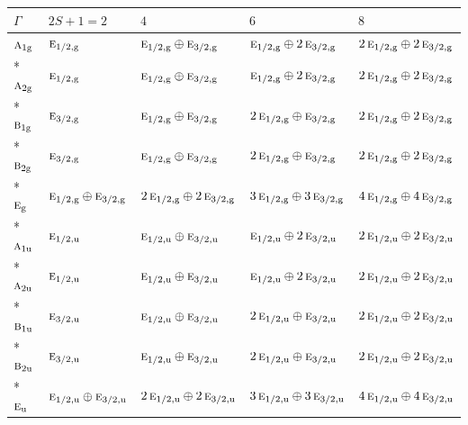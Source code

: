 \documentclass[10pt,a4paper]{article}
\numberwithin{equation}{section}
\newcommand{\irr}[1]{\text{\normalfont\scshape #1}}
\newcommand{\ptag}[1]{\mathrm{#1}}
\begin{document}
{\small\setlength{\tabcolsep}{3pt}\begin{longtable}{@{}lllll@{}}\toprule
$\Gamma$ & $2S + 1 = 2$ & $4$ & $6$ & $8$\\\midrule\endhead
\bottomrule\endfoot\endlastfoot
$\irr{a}_{1\ptag{g}}$ & $\irr{e}_{1/2,\ptag{g}}$ & $\irr{e}_{1/2,\ptag{g}}\oplus \irr{e}_{3/2,\ptag{g}}$ & $\irr{e}_{1/2,\ptag{g}}\oplus 2\,\irr{e}_{3/2,\ptag{g}}$ & $2\,\irr{e}_{1/2,\ptag{g}}\oplus 2\,\irr{e}_{3/2,\ptag{g}}$\\*
$\irr{a}_{2\ptag{g}}$ & $\irr{e}_{1/2,\ptag{g}}$ & $\irr{e}_{1/2,\ptag{g}}\oplus \irr{e}_{3/2,\ptag{g}}$ & $\irr{e}_{1/2,\ptag{g}}\oplus 2\,\irr{e}_{3/2,\ptag{g}}$ & $2\,\irr{e}_{1/2,\ptag{g}}\oplus 2\,\irr{e}_{3/2,\ptag{g}}$\\*
$\irr{b}_{1\ptag{g}}$ & $\irr{e}_{3/2,\ptag{g}}$ & $\irr{e}_{1/2,\ptag{g}}\oplus \irr{e}_{3/2,\ptag{g}}$ & $2\,\irr{e}_{1/2,\ptag{g}}\oplus \irr{e}_{3/2,\ptag{g}}$ & $2\,\irr{e}_{1/2,\ptag{g}}\oplus 2\,\irr{e}_{3/2,\ptag{g}}$\\*
$\irr{b}_{2\ptag{g}}$ & $\irr{e}_{3/2,\ptag{g}}$ & $\irr{e}_{1/2,\ptag{g}}\oplus \irr{e}_{3/2,\ptag{g}}$ & $2\,\irr{e}_{1/2,\ptag{g}}\oplus \irr{e}_{3/2,\ptag{g}}$ & $2\,\irr{e}_{1/2,\ptag{g}}\oplus 2\,\irr{e}_{3/2,\ptag{g}}$\\*
$\irr{e}_{\ptag{g}}$ & $\irr{e}_{1/2,\ptag{g}}\oplus \irr{e}_{3/2,\ptag{g}}$ & $2\,\irr{e}_{1/2,\ptag{g}}\oplus 2\,\irr{e}_{3/2,\ptag{g}}$ & $3\,\irr{e}_{1/2,\ptag{g}}\oplus 3\,\irr{e}_{3/2,\ptag{g}}$ & $4\,\irr{e}_{1/2,\ptag{g}}\oplus 4\,\irr{e}_{3/2,\ptag{g}}$\\*
$\irr{a}_{1\ptag{u}}$ & $\irr{e}_{1/2,\ptag{u}}$ & $\irr{e}_{1/2,\ptag{u}}\oplus \irr{e}_{3/2,\ptag{u}}$ & $\irr{e}_{1/2,\ptag{u}}\oplus 2\,\irr{e}_{3/2,\ptag{u}}$ & $2\,\irr{e}_{1/2,\ptag{u}}\oplus 2\,\irr{e}_{3/2,\ptag{u}}$\\*
$\irr{a}_{2\ptag{u}}$ & $\irr{e}_{1/2,\ptag{u}}$ & $\irr{e}_{1/2,\ptag{u}}\oplus \irr{e}_{3/2,\ptag{u}}$ & $\irr{e}_{1/2,\ptag{u}}\oplus 2\,\irr{e}_{3/2,\ptag{u}}$ & $2\,\irr{e}_{1/2,\ptag{u}}\oplus 2\,\irr{e}_{3/2,\ptag{u}}$\\*
$\irr{b}_{1\ptag{u}}$ & $\irr{e}_{3/2,\ptag{u}}$ & $\irr{e}_{1/2,\ptag{u}}\oplus \irr{e}_{3/2,\ptag{u}}$ & $2\,\irr{e}_{1/2,\ptag{u}}\oplus \irr{e}_{3/2,\ptag{u}}$ & $2\,\irr{e}_{1/2,\ptag{u}}\oplus 2\,\irr{e}_{3/2,\ptag{u}}$\\*
$\irr{b}_{2\ptag{u}}$ & $\irr{e}_{3/2,\ptag{u}}$ & $\irr{e}_{1/2,\ptag{u}}\oplus \irr{e}_{3/2,\ptag{u}}$ & $2\,\irr{e}_{1/2,\ptag{u}}\oplus \irr{e}_{3/2,\ptag{u}}$ & $2\,\irr{e}_{1/2,\ptag{u}}\oplus 2\,\irr{e}_{3/2,\ptag{u}}$\\*
$\irr{e}_{\ptag{u}}$ & $\irr{e}_{1/2,\ptag{u}}\oplus \irr{e}_{3/2,\ptag{u}}$ & $2\,\irr{e}_{1/2,\ptag{u}}\oplus 2\,\irr{e}_{3/2,\ptag{u}}$ & $3\,\irr{e}_{1/2,\ptag{u}}\oplus 3\,\irr{e}_{3/2,\ptag{u}}$ & $4\,\irr{e}_{1/2,\ptag{u}}\oplus 4\,\irr{e}_{3/2,\ptag{u}}$\\
\bottomrule\end{longtable}}
\end{document}
